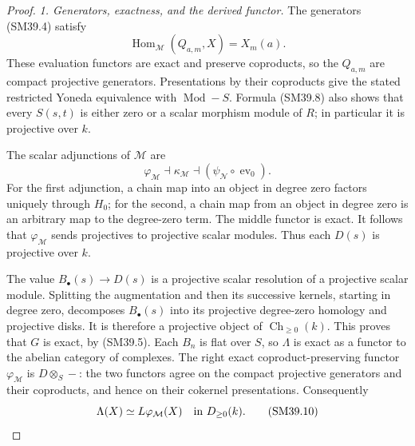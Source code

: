 \begin{proof}
\emph{1. Generators, exactness, and the derived functor.}
The generators (SM39.4) satisfy
\[
       \operatorname{Hom}_{\mathcal M}(Q_{a,m},X)=X_m(a).
                                                               \tag{SM39.8}
\]
These evaluation functors are exact and preserve coproducts,
so the \(Q_{a,m}\) are compact projective generators.
Presentations by their coproducts give the stated restricted
Yoneda equivalence with \(\operatorname{Mod}\!-\!S\).
Formula (SM39.8) also shows that every \(S(s,t)\) is either
zero or a scalar morphism module of \(R\); in particular it
is projective over \(k\).

The scalar adjunctions of \(\mathcal M\) are
\[
 \varphi_{\mathcal M}\dashv\kappa_{\mathcal M}\dashv
        (\psi_{\mathcal N}\circ\operatorname{ev}_0).
                                                               \tag{SM39.9}
\]
For the first adjunction, a chain map into an object in degree
zero factors uniquely through \(H_0\); for the second, a
chain map from an object in degree zero is an arbitrary map
to the degree-zero term.  The middle functor is exact.
It follows that \(\varphi_{\mathcal M}\) sends projectives
to projective scalar modules.  Thus each \(D(s)\) is
projective over \(k\).

The value \(B_\bullet(s)\to D(s)\) is a projective
scalar resolution of a projective scalar module.  Splitting
the augmentation and then its successive kernels, starting
in degree zero, decomposes \(B_\bullet(s)\) into its
projective degree-zero homology and projective disks.
It is therefore a projective object of
\(\operatorname{Ch}_{\ge0}(k)\).  This proves that \(G\)
is exact, by (SM39.5).  Each \(B_n\) is flat over \(S\),
so \(\Lambda\) is exact as a functor to the abelian category
of complexes.  The right exact coproduct-preserving functor
\(\varphi_{\mathcal M}\) is \(D\otimes_S-\): the two
functors agree on the compact projective generators and
their coproducts, and hence on their cokernel presentations.
Consequently
\[
                 \Lambda(X)\simeq L\varphi_{\mathcal M}(X)
                    \quad\hbox{in }D_{\ge0}(k).              \tag{SM39.10}
\]


\end{proof}
